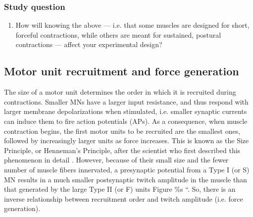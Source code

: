 \documentclass{article}
\begin{document}
\subsubsection{Study question}

\begin{enumerate}
\item How will knowing the above --- i.e. that some muscles are designed for short, forceful contractions, while others are meant for sustained, postural contractions --- affect your experimental design?
\end{enumerate}

\subsection{Motor unit recruitment and force generation}

The size of a motor unit determines the order in which it is recruited during contractions. Smaller MNs have a larger input resistance, and thus respond with larger membrane depolarizations when stimulated, i.e. smaller synaptic currents can induce them to fire action potentials (APs). As a consequence, when muscle contraction begins, the first motor units to be recruited are the smallest ones, followed by increasingly larger units as force increases. This is known as the Size Principle, or Henneman's Principle, after the scientist who first described this phenomenon in detail \citep{Mendell2005size}. However, because of their small size and the fewer number of muscle fibers innervated, a presynaptic potential from a Type I (or S) MN results in a much smaller postsynaptic twitch amplitude in the muscle than that generated by the large Type II (or F) units \citep{}Figure \%s ``. So, there is an inverse relationship between recruitment order and twitch amplitude (i.e. force generation).
\end{document}
